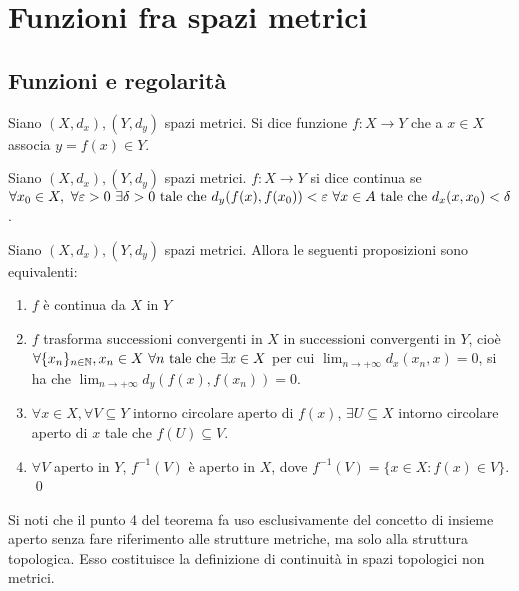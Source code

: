 \chapter{Funzioni fra spazi metrici}

\section{Funzioni e regolarità}

\begin{definition}
    Siano $(X, d_x), (Y, d_y)$ spazi metrici. Si dice funzione $f: X \to Y$ che a $x \in X$ associa $y = f(x) \in Y$.
\end{definition}

\begin{definition}
    Siano $(X, d_x), (Y, d_y)$ spazi metrici. $f: X \to Y$ si dice continua se $\forall x_0 \in X, \ \forall \varepsilon > 0 \ \exists \delta > 0 \tc d_y(f(x), f(x_0)) < \varepsilon \ \forall x \in A \tc d_x(x, x_0) < \delta$.
\end{definition}

\begin{theorem}
    Siano $(X, d_x), (Y, d_y)$ spazi metrici. Allora le seguenti proposizioni sono equivalenti:
    \begin{enumerate}
        \item $f$ è continua da $X$ in $Y$
        
        \item $f$ trasforma successioni convergenti in $X$ in successioni convergenti in $Y$, cioè $\forall \{x_n\}_{n \in \N}, x_n \in X \ \forall n \tc \exists x \in X$ per cui $\displaystyle \lim_{n \to +\infty}d_x(x_n, x)=0$, si ha che $\displaystyle \lim_{n \to +\infty}d_y(f(x),f(x_n))=0$.
        
        \item $\forall x \in X, \forall V \subseteq Y$ intorno circolare aperto di $f(x)$, $\exists U \subseteq X$ intorno circolare aperto di $x$ tale che $f(U) \subseteq V$.

        \item $\forall V$ aperto in $Y$, $f^{-1}(V)$ è aperto in $X$, dove $f^{-1}(V)=\{x \in X : f(x) \in V\}$.
        \qed
    \end{enumerate}
\end{theorem}

\begin{remark}
    Si noti che il punto 4 del teorema fa uso esclusivamente del concetto di insieme aperto senza fare riferimento alle strutture metriche, ma solo alla struttura topologica. Esso costituisce la definizione di continuità in spazi topologici non metrici.
\end{remark}

